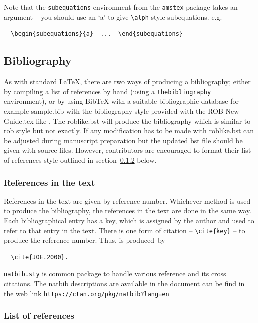 \documentclass[DTMColor]{ROB-New}
\begin{document}
Note that the \verb"subequations" environment from the \verb"amstex" package
takes an argument -- you should use an `a' to give \verb"\alph" style
subequations. e.g.
\begin{verbatim}
  \begin{subequations}{a}  ...  \end{subequations}
\end{verbatim}

\subsection{Bibliography}

As with standard LaTeX, there are two ways of producing a bibliography;
either by compiling a list of references by hand (using a
\verb"thebibliography" environment), or by using BibTeX with a suitable
bibliographic database for example sample.bib with the bibliography style provided with the ROB-New-Guide.tex like \verb"". The roblike.bst will produce the bibliography which is similar to rob style but not exactly. If any modification has to be made with roblike.bst can be adjusted during manuscript preparation but the updated bst file should be given with source files. However, contributors are encouraged to format their list of references style outlined in section~\ref{fullref} below.

\subsubsection{References in the text}

References in the text are given by reference number.
Whichever method is used to produce the bibliography, the references in
the text are done in the same way. Each bibliographical entry has a key,
which is assigned by the author and used to refer to that entry in the
text. There is one form of citation -- \verb"\cite{key}" -- to produce the
reference number. Thus, \cite{JOE.2000} is produced~by
\begin{verbatim}
  \cite{JOE.2000}.
\end{verbatim}

\verb"natbib.sty" is common package to handle various reference and its cross citations. The natbib descriptions are available in the document can be find in the web link \verb"https://ctan.org/pkg/natbib?lang=en"

\subsubsection{List of references}\label{fullref}
\end{document}
